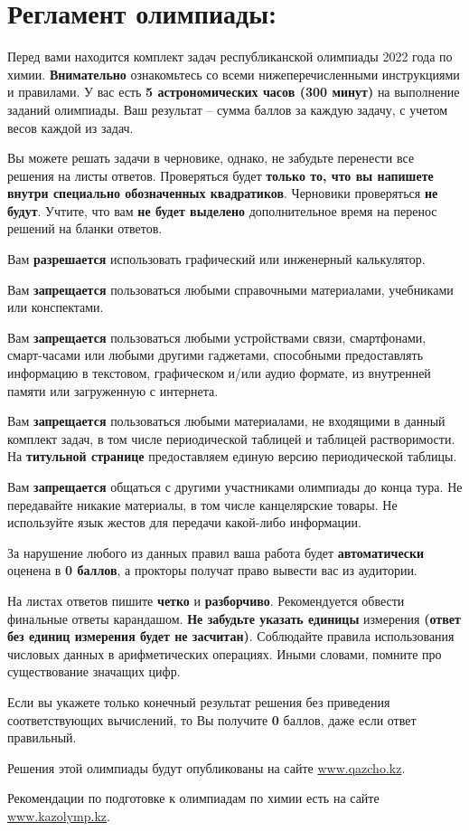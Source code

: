 \section*{Регламент олимпиады:}\vspace{5pt}

\begin{regulations}
Перед вами находится комплект задач республиканской олимпиады 2022 года по химии. \textbf{Внимательно} ознакомьтесь со всеми нижеперечисленными инструкциями и правилами. У вас есть \textbf{5 астрономических часов (300 минут)} на выполнение заданий олимпиады. Ваш результат – сумма баллов за каждую задачу, с учетом весов каждой из задач.

Вы можете решать задачи в черновике, однако, не забудьте перенести все решения на листы ответов. Проверяться будет \textbf{только то, что вы напишете внутри специально обозначенных квадратиков}. Черновики проверяться \textbf{не будут}. Учтите, что вам \textbf{не будет выделено} дополнительное время на перенос решений на бланки ответов.

Вам \textbf{разрешается} использовать графический или инженерный калькулятор.

Вам \textbf{запрещается} пользоваться любыми справочными материалами, учебниками или конспектами.

Вам \textbf{запрещается} пользоваться любыми устройствами связи, смартфонами, смарт-часами или любыми другими гаджетами, способными предоставлять информацию в текстовом, графическом и/или аудио формате, из внутренней памяти или загруженную с интернета.

Вам \textbf{запрещается} пользоваться любыми материалами, не входящими в данный комплект задач, в том числе периодической таблицей и таблицей растворимости. На \textbf{титульной странице} предоставляем единую версию периодической таблицы.

Вам \textbf{запрещается} общаться с другими участниками олимпиады до конца тура. Не передавайте никакие материалы, в том числе канцелярские товары. Не используйте язык жестов для передачи какой-либо информации.

За нарушение любого из данных правил ваша работа будет \textbf{автоматически} оценена в \textbf{0 баллов}, а прокторы получат право вывести вас из аудитории.

На листах ответов пишите \textbf{четко} и \textbf{разборчиво}. Рекомендуется обвести финальные ответы карандашом. \textbf{Не забудьте указать единицы} измерения \textbf{(ответ без единиц измерения будет не засчитан)}. Соблюдайте правила использования числовых данных в арифметических операциях. Иными словами, помните про существование значащих цифр.

Если вы укажете только конечный результат решения без приведения соответствующих вычислений, то Вы получите \textbf{0} баллов, даже если ответ правильный.

Решения этой олимпиады будут опубликованы на сайте \href{https://qazcho.kz}{www.qazcho.kz}.

Рекомендации по подготовке к олимпиадам по химии есть на сайте \\ \href{https://kazolymp.kz}{www.kazolymp.kz}.
\end{regulations}